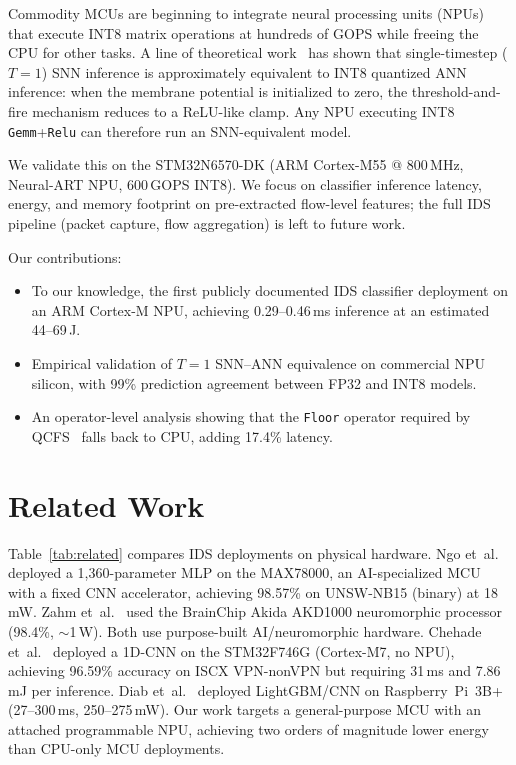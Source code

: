 \documentclass[conference]{IEEEtran}
\begin{document}
Commodity MCUs are beginning to integrate neural processing units (NPUs)
that execute INT8 matrix operations at hundreds of GOPS while freeing
the CPU for other tasks.
A line of theoretical work~\cite{bu2022optimal, jiang2023unified,
bu2025inference} has shown that single-timestep ($T{=}1$) SNN inference
is approximately equivalent to INT8 quantized ANN inference:
when the membrane potential is initialized to zero, the
threshold-and-fire mechanism reduces to a ReLU-like clamp.
Any NPU executing INT8 \texttt{Gemm}+\texttt{Relu} can therefore
run an SNN-equivalent model.

We validate this on the STM32N6570-DK (ARM Cortex-M55
@ 800\,MHz, Neural-ART NPU, 600\,GOPS INT8).
We focus on classifier inference latency, energy, and memory footprint
on pre-extracted flow-level features; the full IDS pipeline (packet
capture, flow aggregation) is left to future work.

Our contributions:
\begin{itemize}
  \item To our knowledge, the first publicly documented IDS classifier
    deployment on an ARM Cortex-M NPU,
    achieving 0.29--0.46\,ms inference at an estimated 44--69\,\textmu J.
  \item Empirical validation of $T{=}1$ SNN--ANN equivalence on
    commercial NPU silicon, with 99\% prediction agreement between
    FP32 and INT8 models.
  \item An operator-level analysis showing that the \texttt{Floor}
    operator required by QCFS~\cite{bu2022optimal} falls back to CPU,
    adding 17.4\% latency.
\end{itemize}

\section{Related Work}
\label{sec:related}

Table~\ref{tab:related} compares IDS deployments on physical hardware.
Ngo et~al.~\cite{ngo2022hhnids} deployed a 1,360-parameter MLP on
the MAX78000, an AI-specialized MCU with a fixed CNN accelerator,
achieving 98.57\% on UNSW-NB15 (binary) at 18\,mW.
Zahm et~al.~\cite{zahm2024csiac} used the BrainChip Akida AKD1000
neuromorphic processor (98.4\%, ${\sim}$1\,W).
Both use purpose-built AI/neuromorphic hardware.
Chehade et~al.~\cite{chehade2025stm32} deployed a 1D-CNN on the
STM32F746G (Cortex-M7, no NPU), achieving 96.59\% accuracy on
ISCX VPN-nonVPN but requiring 31\,ms and 7.86\,mJ per inference.
Diab et~al.~\cite{diab2025rpi} deployed LightGBM/CNN on Raspberry~Pi~3B+
(27--300\,ms, 250--275\,mW).
Our work targets a general-purpose MCU with an attached programmable NPU,
achieving two orders of magnitude lower energy than CPU-only MCU
deployments.
\end{document}

